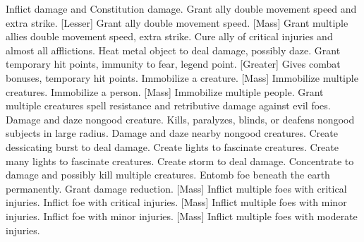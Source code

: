     {Inflict damage and Constitution damage.}
    {Grant ally double movement speed and extra strike.}
[Lesser]
    {Grant ally double movement speed.}
[Mass]
    {Grant multiple allies double movement speed, extra strike.}
    {Cure ally of critical injuries and almost all afflictions.}
    {Heat metal object to deal damage, possibly daze.}
    {Grant temporary hit points, immunity to fear, legend point.}
[Greater]
    {Gives combat bonuses, temporary hit points.}
    {Immobilize a creature.}
[Mass]
    {Immobilize multiple creatures.}
    {Immobilize a person.}
[Mass]
    {Immobilize multiple people.}
    {Grant multiple creatures spell resistance and retributive damage against evil foes.}
    {Damage and daze nongood creature.}
    {Kills, paralyzes, blinds, or deafens nongood subjects in large radius.}
    {Damage and daze nearby nongood creatures.}
    {Create dessicating burst to deal damage.}
    {Create lights to fascinate creatures.}
    {Create many lights to fascinate creatures.}
    {Create storm to deal damage.}
    {Concentrate to damage and possibly kill multiple creatures.}
    {Entomb foe beneath the earth permanently.}
    {Grant damage reduction.}
[Mass]
    {Inflict multiple foes with critical injuries.}
    {Inflict foe with critical injuries.}
[Mass]
    {Inflict multiple foes with minor injuries.}
    {Inflict foe with minor injuries.}
[Mass]
    {Inflict multiple foes with moderate injuries.}
